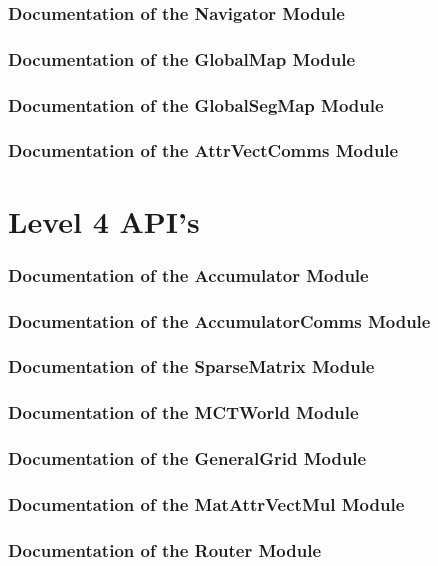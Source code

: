 \documentclass{article}
\begin{document}
\section{Documentation of the Navigator Module}

\section{Documentation of the GlobalMap Module}

\section{Documentation of the GlobalSegMap Module}

\section{Documentation of the AttrVectComms Module}

\part{Level 4 API's}
\section{Documentation of the Accumulator Module}

\section{Documentation of the AccumulatorComms Module}

\section{Documentation of the SparseMatrix Module}

\section{Documentation of the MCTWorld Module}

\section{Documentation of the GeneralGrid Module}

\section{Documentation of the MatAttrVectMul Module}

\section{Documentation of the Router Module}

\end{document}
